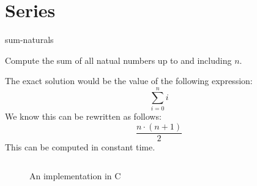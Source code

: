 \documentclass[main.tex]{subfiles}
\begin{document}
\chapter{Series}

\begin{libraryfile}
  \begin{algorithm}{1}{1}{sum-naturals}
    \begin{algorithm-description}
        Compute the sum of all natual numbers up to and including $n$.
    \end{algorithm-description}
    \begin{algorithm-explanation}
      The exact solution would be the value of the following expression:
      \[ \sum_{i=0}^{n}i \]
      We know this can be rewritten as follows:
      \[ \frac{n\cdot(n+1)}{2} \]
      This can be computed in constant time.
      \begin{figure}[H]
        \centering
        \inputminted[firstline=5, lastline=7]{c}{\lib{c}{series.c}}
        \caption{An implementation in C}
      \end{figure}
    \end{algorithm-explanation}
  \end{algorithm}
\end{libraryfile}
\end{document}
